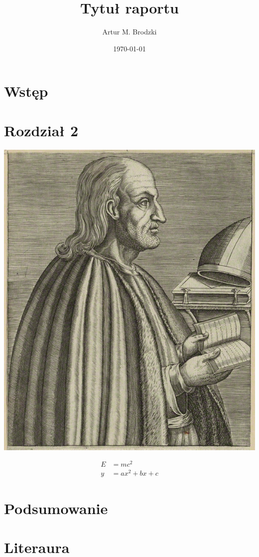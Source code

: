 \documentclass{eiti-raport}
\begin{document}
\author{Artur M. Brodzki}
\date{\today}
\subject{Nazwa przedmiotu}
\title{Tytuł raportu}

\maketitle


\begin{multicols}{2}

\section{Wstęp} \label{sec:intro}
\lipsum[1-2]

\section{Rozdział 2} \label{sec:2}
\lipsum[3]
\begin{center}
	\label{fig:anzelm}
	\includegraphics[width=0.5\linewidth]{img/anzelm.PNG}
\end{center}
\lipsum[4]
\begin{align*}
E & = m c^2 \\ 
y & = a x^2 + bx + c
\end{align*}
\lipsum[5]

\section{Podsumowanie} \label{sec:summary}
\lipsum[6]

\section*{Literaura}


\end{multicols}
\end{document}
